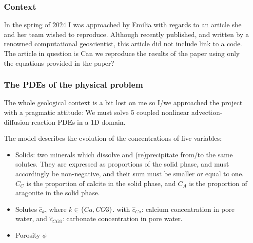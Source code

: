 \documentclass[a4paper]{article}
\begin{document}

\subsubsection*{Context}

In the spring of 2024 I was approached by Emilia with regards to an article she and 
her team wished to reproduce. Although recently published, and written by a renowned computational
geoscientist, this article did not include link to a code. 
The article in question is \cite{lheu18} 
Can we reproduce the results of the paper using only the equations provided in the paper?

\subsubsection*{The PDEs of the physical problem}

The whole geological context is a bit lost on me so I/we approached the project with a pragmatic 
attitude: We must solve 5 coupled nonlinear advection-diffusion-reaction PDEs in a 1D domain.

The model describes the evolution of the concentrations of five variables:
\begin{itemize}
\item Solids: two minerals which dissolve and (re)precipitate from/to the same
solutes. They are expressed as proportions of the solid phase, and must
accordingly be non-negative, and their sum must be smaller or equal to one.
$C_C$ is the proportion of calcite in the solid phase, and $C_A$ is the 
proportion of aragonite in the solid phase.

\item Solutes $\hat{c}_k$, where $k \in \{ Ca,CO3\}$.
with $\hat{c}_{Ca}$: calcium concentration in pore water, and
$\hat{c}_{CO3}$: carbonate concentration in pore water.

\item Porosity $\phi$
\end{itemize}
\end{document}
